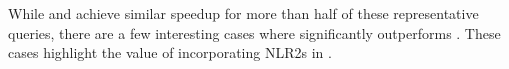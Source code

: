 






While \genrewrite and \baseline achieve similar speedup for more than half of these representative queries, there are a few interesting cases where \genrewrite significantly outperforms \baseline. These cases highlight the value of incorporating NLR2s in \genrewrite. 



